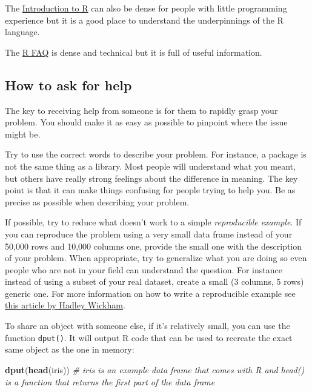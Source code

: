 \documentclass[
]{book}
\newenvironment{Shaded}{\begin{snugshade}}{\end{snugshade}}
\newcommand{\CommentTok}[1]{\textcolor[rgb]{0.56,0.35,0.01}{\textit{#1}}}
\newcommand{\FunctionTok}[1]{\textcolor[rgb]{0.13,0.29,0.53}{\textbf{#1}}}
\newcommand{\NormalTok}[1]{#1}
\begin{document}
The \href{http://cran.r-project.org/doc/manuals/R-intro.pdf}{Introduction to R} can
also be dense for people with little programming experience but it is a good
place to understand the underpinnings of the R language.

The \href{http://cran.r-project.org/doc/FAQ/R-FAQ.html}{R FAQ} is dense and technical
but it is full of useful information.

\hypertarget{how-to-ask-for-help}{%
\subsection{How to ask for help}\label{how-to-ask-for-help}}

The key to receiving help from someone is for them to rapidly grasp your
problem. You should make it as easy as possible to pinpoint where the issue
might be.

Try to use the correct words to describe your problem. For instance, a package
is not the same thing as a library. Most people will understand what you meant,
but others have really strong feelings about the difference in meaning. The key
point is that it can make things confusing for people trying to help you. Be as
precise as possible when describing your problem.

If possible, try to reduce what doesn't work to a simple \emph{reproducible
example}. If you can reproduce the problem using a very small data frame
instead of your 50,000 rows and 10,000 columns one, provide the small one with
the description of your problem. When appropriate, try to generalize what you
are doing so even people who are not in your field can understand the
question. For instance instead of using a subset of your real dataset, create a
small (3 columns, 5 rows) generic one. For more information on how to write a
reproducible example see \href{http://adv-r.had.co.nz/Reproducibility.html}{this article by Hadley Wickham}.

To share an object with someone else, if it's relatively small, you can use the
function \texttt{dput()}. It will output R code that can be used to recreate the exact
same object as the one in memory:

\begin{Shaded}
\begin{Highlighting}[]
\FunctionTok{dput}\NormalTok{(}\FunctionTok{head}\NormalTok{(iris)) }\CommentTok{\# iris is an example data frame that comes with R and head() is a function that returns the first part of the data frame}
\end{Highlighting}
\end{Shaded}
\end{document}
